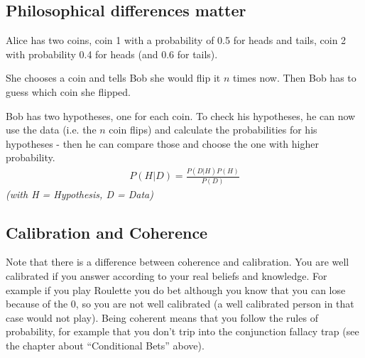 \subsection*{Philosophical differences matter}
Alice has two coins, coin 1 with a probability of 0.5 for heads and tails, coin 2 with probability 0.4 for heads (and 0.6 for tails). 

She chooses a coin and tells Bob she would flip it $n$ times now. Then Bob has to guess which coin she flipped.

Bob has two hypotheses, one for each coin. To check his hypotheses, he can now use the data (i.e. the $n$ coin flips) and calculate the probabilities for his hypotheses - then he can compare those and choose the one with higher probability.
\begin{align*}
P(H|D) = \frac{P(D|H)P(H)}{P(D)}
\end{align*}
\textit{(with H = Hypothesis, D = Data)}

\subsection*{Calibration and Coherence}
Note that there is a difference between coherence and calibration.
You are well calibrated if you answer according to your real beliefs and knowledge. For example if you play Roulette you do bet although you know that you can lose because of the 0, so you are not well calibrated (a well calibrated person in that case would not play). 
Being coherent means that you follow the rules of probability, for example that you don't trip into the conjunction fallacy trap (see the chapter about ``Conditional Bets'' above).

